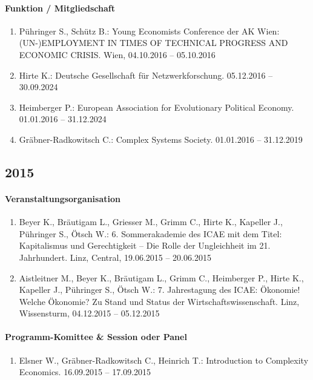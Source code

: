 \paragraph{Funktion / Mitgliedschaft}
\begin{enumerate}[leftmargin=*, labelsep=0.5cm]
\item Pühringer S., Schütz B.: Young Economists Conference der AK Wien: (UN-)EMPLOYMENT IN TIMES OF TECHNICAL PROGRESS AND ECONOMIC CRISIS. Wien, 04.10.2016 -- 05.10.2016
\item Hirte K.: Deutsche Gesellschaft für Netzwerkforschung. 05.12.2016 -- 30.09.2024
\item Heimberger P.: European Association for Evolutionary Political Economy. 01.01.2016 -- 31.12.2024
\item Gräbner-Radkowitsch C.: Complex Systems Society. 01.01.2016 -- 31.12.2019
\end{enumerate}
\subsection*{2015}
\paragraph{Veranstaltungsorganisation}
\begin{enumerate}[leftmargin=*, labelsep=0.5cm]
\item Beyer K., Bräutigam L., Griesser M., Grimm C., Hirte K., Kapeller J., Pühringer S., Ötsch W.: 6. Sommerakademie des ICAE mit dem Titel: Kapitalismus und Gerechtigkeit -- Die Rolle der Ungleichheit im 21. Jahrhundert. Linz, Central, 19.06.2015 -- 20.06.2015
\item Aistleitner M., Beyer K., Bräutigam L., Grimm C., Heimberger P., Hirte K., Kapeller J., Pühringer S., Ötsch W.: 7. Jahrestagung des ICAE: Ökonomie! Welche Ökonomie? Zu Stand und Status der Wirtschaftswissenschaft. Linz, Wissensturm, 04.12.2015 -- 05.12.2015
\end{enumerate}

\paragraph{Programm-Komittee \& Session oder Panel}
\begin{enumerate}[leftmargin=*, labelsep=0.5cm]
\item Elsner W., Gräbner-Radkowitsch C., Heinrich T.: Introduction to Complexity Economics. 16.09.2015 -- 17.09.2015
\end{enumerate}

